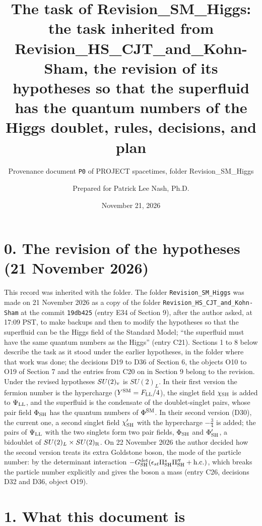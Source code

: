 \documentclass[
  10pt,
]{article}
\title{The task of Revision\_SM\_Higgs: the task inherited from
Revision\_HS\_CJT\_and\_Kohn-Sham, the revision of its hypotheses so
that the superfluid has the quantum numbers of the Higgs doublet, rules,
decisions, and plan}
\subtitle{Provenance document \texttt{P0} of PROJECT spacetimes, folder
Revision\_SM\_Higgs}
\author{Prepared for Patrick Lee Nash, Ph.D.}
\date{November 21, 2026}
\begin{document}
\maketitle

\hypertarget{the-revision-of-the-hypotheses-21-november-2026}{%
\section{0. The revision of the hypotheses (21 November
2026)}\label{the-revision-of-the-hypotheses-21-november-2026}}

This record was inherited with the folder. The folder
\texttt{Revision\_SM\_Higgs} was made on 21 November 2026 as a copy of
the folder \texttt{Revision\_HS\_CJT\_and\_Kohn-Sham} at the commit
\texttt{19db425} (entry E34 of Section 9), after the author asked, at
17:09 PST, to make backups and then to modify the hypotheses so that the
superfluid can be the Higgs field of the Standard Model; ``the
superfluid must have the same quantum numbers as the Higgs'' (entry
C21). Sections 1 to 8 below describe the task as it stood under the
earlier hypotheses, in the folder where that work was done; the
decisions D19 to D36 of Section 6, the objects O10 to O19 of Section 7
and the entries from C20 on in Section 9 belong to the revision. Under
the revised hypotheses \(SU(2)_{\rm v}\) is \(SU(2)_L\). In their first
version the fermion number is the hypercharge
(\(Y^{\rm SM}=F_{\rm LL}/4\)), the singlet field \(\chi_{\rm SH}\) is
added to \(\Psi_{\rm LL}\), and the superfluid is the condensate of the
doublet-singlet pairs, whose pair field \(\Phi_{\rm SH}\) has the
quantum numbers of \(\Phi^{\rm SM}\). In their second version (D30), the
current one, a second singlet field \(\chi'_{\rm SH}\) with the
hypercharge \(-\tfrac34\) is added; the pairs of \(\Psi_{\rm LL}\) with
the two singlets form two pair fields, \(\Phi_{\rm SH}\) and
\(\Phi'_{\rm SH}\), a bidoublet of \(SU(2)_L\times SU(2)_{\rm R}\). On
22 November 2026 the author decided how the second version treats its
extra Goldstone boson, the mode of the particle number: by the
determinant interaction
\(-G^{\rm det}_{\rm SH}(\epsilon_{st}\Pi^s_{\rm SH}\Pi'^t_{\rm SH}+{\rm h.c.})\),
which breaks the particle number explicitly and gives the boson a mass
(entry C26, decisions D32 and D36, object O19).

\hypertarget{what-this-document-is}{%
\section{1. What this document is}\label{what-this-document-is}}
\end{document}

